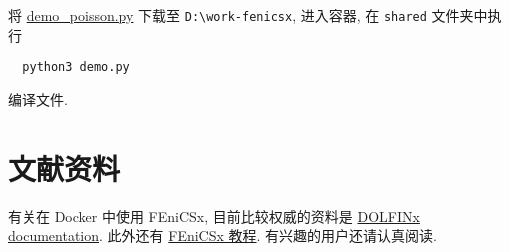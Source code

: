 \documentclass[fontset=founder]{ctexrep}
\begin{document}
将 \href{https://docs.fenicsproject.org/dolfinx/main/python/_downloads/756b4617c0f8921ed14fbd158af0c99c/demo_poisson.py}{demo\_poisson.py} 下载至 \texttt{D:\textbackslash work-fenicsx},
进入容器,
在 \texttt{shared} 文件夹中执行
\begin{lstlisting}
  python3 demo.py
\end{lstlisting}
编译文件.

\section{文献资料}

有关在 Docker 中使用 FEniCSx,
目前比较权威的资料是  \href{https://docs.fenicsproject.org/dolfinx/main/python/index.html}{DOLFINx documentation}.
此外还有  \href{https://jorgensd.github.io/dolfinx-tutorial/index.html}{FEniCSx 教程}.
有兴趣的用户还请认真阅读.
\end{document}
